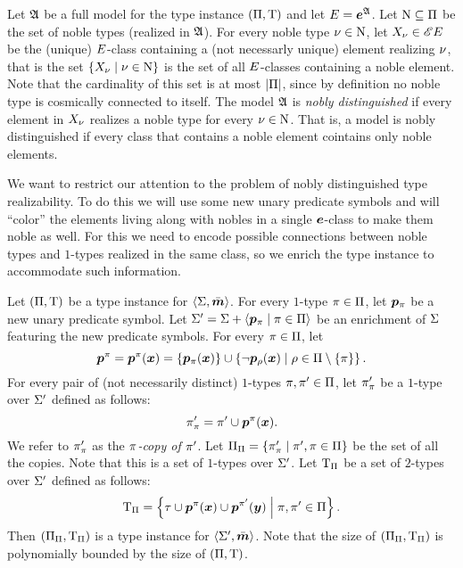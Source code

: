 \begin{definition}
Let $\mathfrak{A}$ be a full model for the type instance $(\Pi,\mathrm{T})$ and let
$E = \bm{e}^{\mathfrak{A}}$.
Let $\mathrm{N} \subseteq \Pi$ be the set of noble types (realized in $\mathfrak{A}$).
For every noble type $\nu \in \mathrm{N}$, let $X_\nu \in {\mathscr{E}E}$ be the
(unique) $E$-class containing a (not necessarly unique) element realizing
$\nu$, that is the set $\left\{X_\nu\mathrel{}\middle|\mathrel{}\nu \in \mathrm{N}\right\}$ is the set of
all $E$-classes containing a noble element. Note that the cardinality of
this set is at most $\left|\Pi\right|$, since by definition no noble type is
cosmically connected to itself.
The model $\mathfrak{A}$ is \emph{nobly distinguished} if every element in $X_\nu$ realizes a noble type for every $\nu \in \mathrm{N}$. That is, a model is nobly distinguished if every class that contains a noble element cointains
only noble elements.
\end{definition}
We want to restrict our attention to the problem of nobly distinguished type
realizability. To do this we will use some new unary predicate symbols and will
``color'' the elements living along with nobles in a single $\bm{e}$-class to make
them noble as well.
For this we need to encode possible connections between noble types and
$1$-types realized in the same class, so we enrich the type instance to
accommodate such information.
\begin{definition}
Let $(\Pi,\mathrm{T})$ be a type instance for $\left\langle \mathrm{\Sigma},\bar{\bm{m}} \right\rangle$. For every
$1$-type $\pi \in \Pi$, let $\bm{p}_{\pi}$ be a new unary predicate symbol. Let
$\mathrm{\Sigma'} = \mathrm{\Sigma} + \left\langle \bm{p}_{\pi} \mathrel{}\middle|\mathrel{} \pi \in \Pi \right\rangle$ be an enrichment of
$\mathrm{\Sigma}$ featuring the new predicate symbols.
For every $\pi \in \Pi$, let 
\[
  \bm{p}^\pi = \bm{p}^\pi(\bm{x}) = \left\{\bm{p}_{\pi}(\bm{x})\right\} \cup
  \left\{\lnot\bm{p}_{\rho}(\bm{x})\mathrel{}\middle|\mathrel{}\rho \in \Pi \setminus \left\{\pi\right\}\right\}.
\]
For every pair of (not necessarily distinct) $1$-types $\pi, {\pi'} \in
\Pi$, let $\pi_\pi'$ be a $1$-type over $\mathrm{\Sigma'}$ defined as follows:
\[
  \pi_\pi' = \pi' \cup \bm{p}^\pi(\bm{x}).
\]
We refer to $\pi_\pi'$ as the \emph{$\pi$-copy of $\pi'$}. Let
$\Pi_\Pi = \left\{\pi'_\pi\mathrel{}\middle|\mathrel{}\pi',\pi \in \Pi\right\}$ be the set of all
the copies. Note that this is a set of $1$-types over $\mathrm{\Sigma'}$. Let
$\mathrm{T}_\Pi$ be a set of $2$-types over $\mathrm{\Sigma'}$ defined as follows:
\[
  \mathrm{T}_\Pi = \left\{\tau \cup \bm{p}^\pi(\bm{x}) \cup
  \bm{p}^{\pi'}(\bm{y})\mathrel{}\middle|\mathrel{}\pi,{\pi'} \in \Pi\right\}.
\]
Then $(\Pi_\Pi,\mathrm{T}_\Pi)$ is a type instance for $\left\langle \mathrm{\Sigma'},\bar{\bm{m}} \right\rangle$. Note
that the size of $(\Pi_\Pi,\mathrm{T}_\Pi)$ is polynomially bounded by the size
of $(\Pi,\mathrm{T})$.
\end{definition}
